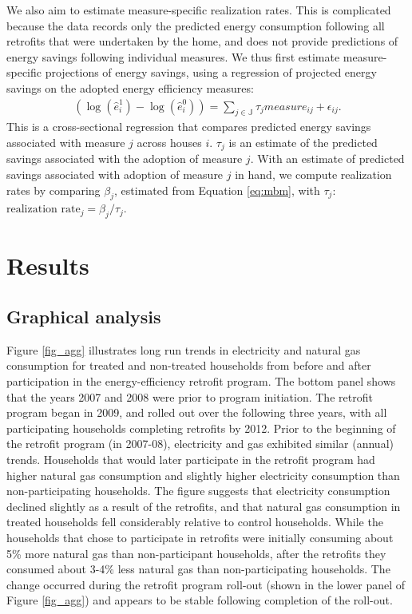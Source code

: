 \documentclass{article}
\begin{document}
We also aim to estimate measure-specific realization rates. This is complicated because the data records only the predicted energy consumption following all retrofits that were undertaken by the home, and does not provide predictions of energy savings following individual measures. We thus first estimate measure-specific projections of energy savings, using a regression of projected energy savings on the adopted energy efficiency measures:
\begin{align}
	\left(\log(\hat{e}^1_i) - \log(\hat{e}^0_i) \right) = \sum_{j \in \mathbb{J}}\tau_j measure_{ij} + \epsilon_{ij}.
	\label{eq:proj_mbm}
\end{align}
This is a cross-sectional regression that compares predicted energy savings associated with measure $j$ across houses $i$. $\tau_j$ is an estimate of the predicted savings associated with the adoption of measure $j$. With an estimate of predicted savings associated with adoption of measure $j$ in hand, we compute realization rates by comparing $\beta_j$, estimated from Equation \eqref{eq:mbm}, with $\tau_j$: $\text{realization rate}_j=\beta_j / \tau_j$.


\section{Results}

\subsection{Graphical analysis}
Figure \ref{fig_agg} illustrates long run trends in electricity and natural gas consumption for treated and non-treated households from before and after participation in the energy-efficiency retrofit program. The bottom panel shows that the years 2007 and 2008 were prior to program initiation. The retrofit program began in 2009, and rolled out over the following three years, with all participating households completing retrofits by 2012. Prior to the beginning of the retrofit program (in 2007-08), electricity and gas exhibited similar (annual) trends. Households that would later participate in the retrofit program had higher natural gas consumption and slightly higher electricity consumption than non-participating households. The figure suggests that electricity consumption declined slightly as a result of the retrofits, and that natural gas consumption in treated households fell considerably relative to control households. While the households that chose to participate in retrofits were initially consuming about 5\% more natural gas than non-participant households, after the retrofits they consumed about 3-4\% less natural gas than non-participating households. The change occurred during the retrofit program roll-out (shown in the lower panel of Figure \ref{fig_agg}) and appears to be stable following completion of the roll-out.
\end{document}
